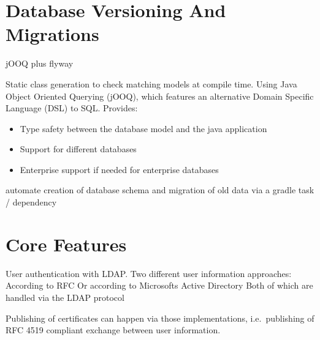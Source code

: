 \section{Database Versioning And Migrations}
jOOQ plus flyway

Static class generation to check matching models at compile time.
Using Java Object Oriented Querying (jOOQ), which features an alternative Domain Specific Language (DSL) to SQL.
Provides:
\begin{itemize}
    \item Type safety between the database model and the java application
    \item Support for different databases
    \item Enterprise support if needed for enterprise databases
\end{itemize}

automate creation of database schema and migration of old data via a gradle task / dependency

\section{Core Features}
User authentication with LDAP.
Two different user information approaches:
According to RFC%
Or according to Microsofts Active Directory
Both of which are handled via the LDAP protocol

Publishing of certificates can happen via those implementations, i.e.\ publishing of RFC 4519 compliant exchange between
user information.
